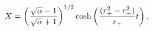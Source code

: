 \begin{equation}
X = \left( \sqrt{\alpha} - 1 \over \sqrt{\alpha} + 1 \right)^{1/2}
\cosh  \left( {(r_+^2 - r_-^2) \over r_+} t \right),
\end{equation}

